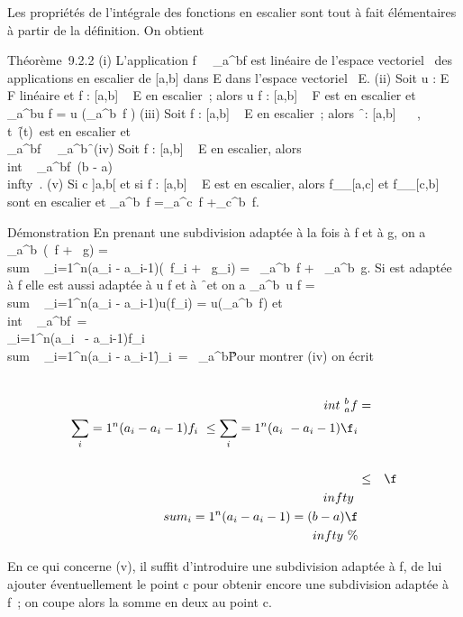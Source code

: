 \documentclass[]{article}
\begin{document}
Les propriétés de l'intégrale des fonctions en escalier sont tout à fait
élémentaires à partir de la définition. On obtient

Théorème~9.2.2 (i) L'application
f\mapsto~\int ~
_a^bf est linéaire de l'espace vectoriel ~des applications
en escalier de [a,b] dans E dans l'espace vectoriel ~E. (ii) Soit u
: E \rightarrow~ F linéaire et f : [a,b] \rightarrow~ E en escalier~; alors u \cdot f :
[a,b] \rightarrow~ F est en escalier et \int ~
_a^bu \cdot f = u\left
(\int  _a^b~f\right
) (iii) Soit f : [a,b] \rightarrow~ E en escalier~; alors
\f\ : [a,b] \rightarrow~ ~,
t\mapsto~\f(t)\
est en escalier et \\\int
 _a^bf\
\leq\int ~
_a^b\f\
(iv) Soit f : [a,b] \rightarrow~ E en escalier, alors
\\int ~
_a^bf\ \leq (b -
a)\f\\infty~. (v) Si c
\in]a,b[ et si f : [a,b] \rightarrow~ E est en escalier, alors
f__[a,c] et
f__[c,b] sont en escalier et
\int  _a^b~f
=\int  _a^c~f
+\int  _c^b~f.

Démonstration En prenant une subdivision adaptée à la fois à f et à g,
on a \int  _a^b~(\alpha~f + \beta~g)
= \\sum ~
_i=1^n(a_i - a_i-1)(\alpha~f_i +
\beta~g_i) = \alpha~\int  _a^b~f +
\beta~\int  _a^b~g. Si \sigma est adaptée à
f elle est aussi adaptée à u \cdot f et à
\f\ et on a
\int  _a^b~u \cdot f
= \\sum ~
_i=1^n(a_i - a_i-1)u(f_i) =
u(\int  _a^b~f) et
\\int ~
_a^bf\
=\\
\sum  _i=1^n(a_i~ -
a_i-1)f_i\
\leq\\sum ~
_i=1^n(a_i -
a_i-1)\f_i\
=\int ~
_a^b\f\.
Pour montrer (iv) on écrit

\begin{align*}
\\int ~
_a^bf& =&
\\\sum
_i=1^n(a_ i -
a_i-1)f_i\
\leq\sum _i=1^n(a_ i~ -
a_i-1)\f_i\\%
\\ & \leq&
\f\\infty~\\sum
_i=1^n(a_ i - a_i-1) = (b -
a)\f\\infty~ \%&
\\ \end{align*}

En ce qui concerne (v), il suffit d'introduire une subdivision \sigma adaptée
à f, de lui ajouter éventuellement le point c pour obtenir encore une
subdivision adaptée à f~; on coupe alors la somme en deux au point c.
\end{document}
